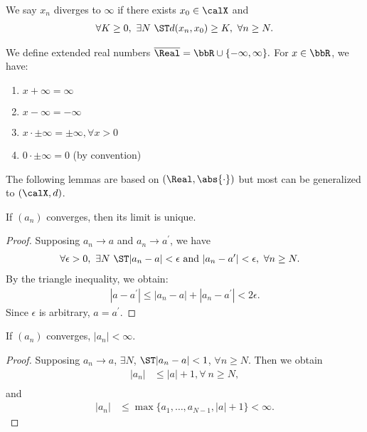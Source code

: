 \documentclass[../aipt.tex]{subfiles}
\begin{document}
\begin{Definition}
We say $x_n$ diverges to $\infty$ if there exists $x_0\in\calX$ and
\begin{align*}
\forall K\geq 0,\ \exists N\ \ST d(x_n,x_0) \geq K,\ \forall n\geq N.
\end{align*}
\end{Definition}

We define extended real numbers $\overline{\Real} = \bbR \cup \{-\infty, \infty\}.$ For $x \in \bbR$, we have:
\begin{enumerate}[1)]
\item $x + \infty = \infty$
\item $x - \infty = -\infty$
\item $x \cdot \pm\infty = \pm\infty, \forall x > 0$
\item $0 \cdot \pm\infty = 0$ (by convention)
\end{enumerate}

The following lemmas are based on $(\Real, \abs{\cdot})$ but most can be generalized to $(\calX,d)$. 

\begin{Lemma}\label{wk1:unique}
If $(a_n)$ converges, then its limit is unique.
\end{Lemma}

\begin{proof}
Supposing $a_n \to a$ and $a_n \to a^\prime$, we have
\begin{align*}
\forall \epsilon > 0,\ \exists N\ \ST &|a_n - a| < \epsilon \text{ and } |a_n - a^\prime| < \epsilon,\ \forall n \geq N.
\end{align*}
By the triangle inequality, we obtain:
\begin{align*}
|a - a^\prime| \leq |a_n - a| + |a_n - a^\prime| < 2\epsilon.
\end{align*}
Since $\epsilon$ is arbitrary, $a = a^\prime$. 
\end{proof}

\begin{Lemma}\label{lem:conv_bdd}
If $(a_n)$ converges, $|a_n| < \infty$.
\end{Lemma}

\begin{proof}
Supposing $a_n \to a$, $\exists N$, $\ST |a_n - a| < 1$, $\forall n \geq N$. Then we obtain
\begin{align*}
|a_n| &\leq |a| + 1, \forall\ n \geq N, \\
\end{align*}
and
\begin{align*}
|a_n| &\leq \max \{a_1, \ldots, a_{N-1}, |a|+1\} < \infty.
\end{align*} 
\end{proof}
\end{document}
